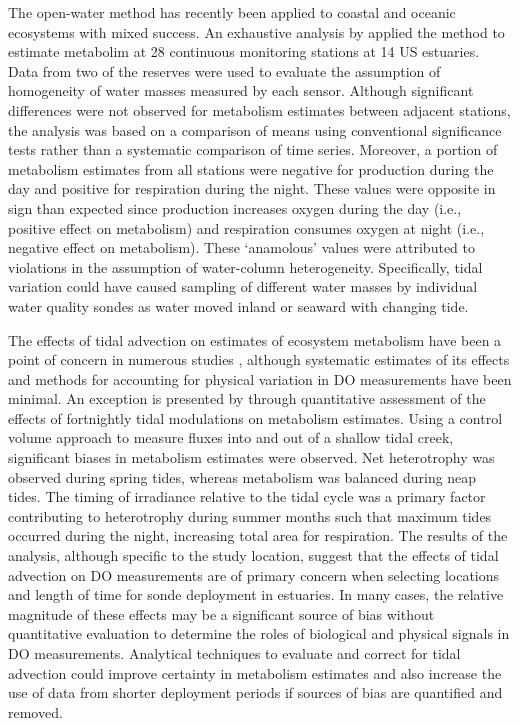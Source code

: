 \documentclass[letterpaper,12pt,oneside]{article}\usepackage[]{graphicx}\usepackage[]{color}
\begin{document}
The open-water method has recently been applied to coastal and oceanic ecosystems with mixed success.  An exhaustive analysis by \citet{Caffrey03} applied the method to estimate metabolim at 28 continuous monitoring stations at 14 US estuaries.  Data from two of the reserves were used to evaluate the assumption of homogeneity of water masses measured by each sensor.  Although significant differences were not observed for metabolism estimates between adjacent stations, the analysis was based on a comparison of means using conventional significance tests rather than a systematic comparison of time series.  Moreover, a portion of metabolism estimates from all stations were negative for production during the day and positive for respiration during the night.  These values were opposite in sign than expected since production increases oxygen during the day (i.e., positive effect on metabolism) and respiration consumes oxygen at night (i.e., negative effect on metabolism).  These `anamolous' values were attributed to violations in the assumption of water-column heterogeneity.  Specifically, tidal variation could have caused sampling of different water masses by individual water quality sondes as water moved inland or seaward with changing tide. 

The effects of tidal advection on estimates of ecosystem metabolism have been a point of concern in numerous studies \citep{Ziegler98,Caffrey03,Collins13,Howarth14}, although systematic estimates of its effects and methods for accounting for physical variation in \ac{DO} measurements have been minimal.  An exception is presented by \citet{Nidzieko14} through quantitative assessment of the effects of fortnightly tidal modulations on metabolism estimates.  Using a control volume approach to measure fluxes into and out of a shallow tidal creek, significant biases in metabolism estimates were observed.  Net heterotrophy was observed during spring tides, whereas metabolism was balanced during neap tides.  The timing of irradiance relative to the tidal cycle was a primary factor contributing to heterotrophy during summer months such that maximum tides occurred during the night, increasing total area for respiration.  The results of the analysis, although specific to the study location, suggest that the effects of tidal advection on \ac{DO} measurements are of primary concern when selecting locations and length of time for sonde deployment in estuaries.  In many cases, the relative magnitude of these effects may be a significant source of bias without quantitative evaluation to determine the roles of biological and physical signals in \ac{DO} measurements. Analytical techniques to evaluate and correct for tidal advection could improve certainty in metabolism estimates and also increase the use of data from shorter deployment periods if sources of bias are quantified and removed.       
\end{document}
